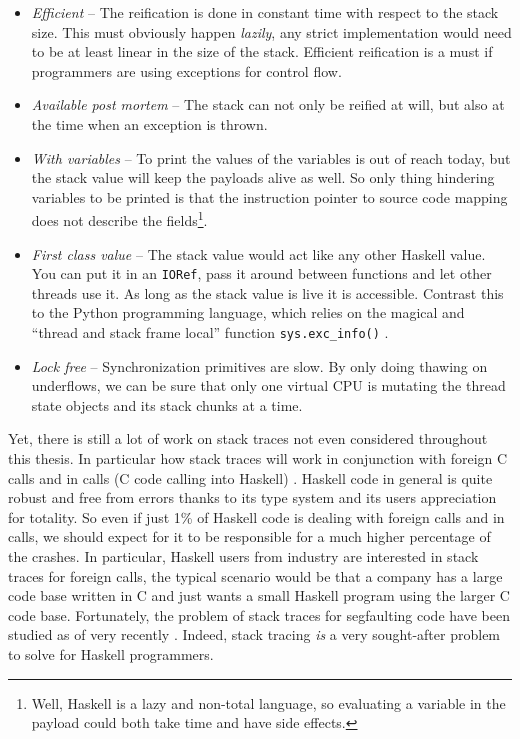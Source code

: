 \begin{itemize}
  \item
    \emph{Efficient} -- The reification is done in constant time with
    respect to the stack size. This must obviously happen \emph{lazily},
    any strict implementation would need to be at least linear in the
    size of the stack. Efficient reification is a must if programmers are
    using exceptions for control flow.

  \item
    \emph{Available post mortem} -- The stack can not only be reified at
    will, but also at the time when an exception is thrown.

  \item
    \emph{With variables} -- To print the values of the variables is out
    of reach today, but the stack value will keep the payloads alive as
    well. So only thing hindering variables to be printed is that the
    instruction pointer to source code mapping does not describe the
    fields\footnote{Well, Haskell is a lazy and non-total language, so
      evaluating a variable in the payload could both take time and have
      side effects.}.

  \item
    \emph{First class value} -- The stack value would act like any
    other Haskell value. You can put it in an \texttt{IORef}, pass it
    around between functions and let other threads use it. As long
    as the stack value is live it is accessible. Contrast this to
    the Python programming language, which relies on the magical and
    ``thread and stack frame local'' function \texttt{sys.exc\_info()}
    \cite{python_docs_sys_exc_info}.

  \item
    \emph{Lock free} -- Synchronization primitives are slow. By only
    doing thawing on underflows, we can be sure that only one virtual
    CPU is mutating the thread state objects and its stack chunks at a
    time.

\end{itemize}

Yet, there is still a lot of work on stack traces not even considered
throughout this thesis. In particular how stack traces will work in
conjunction with foreign C calls and in calls (C code calling into
Haskell) . Haskell code in general is quite robust and free from errors
thanks to its type system and its users appreciation for totality. So
even if just 1\% of Haskell code is dealing with foreign calls and in
calls, we should expect for it to be responsible for a much higher
percentage of the crashes. In particular, Haskell users from industry
are interested in stack traces for foreign calls, the typical scenario
would be that a company has a large code base written in C and just
wants a small Haskell program using the larger C code base. Fortunately,
the problem of stack traces for segfaulting code have been studied as of
very recently \cite{github_blitzcode_ghc_stack}. Indeed, stack tracing
\emph{is} a very sought-after problem to solve for Haskell programmers.
